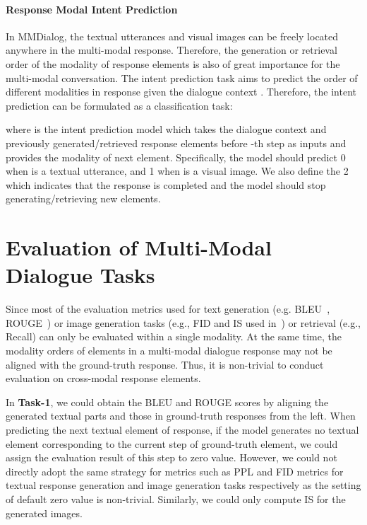 \documentclass[11pt]{article}
\newcommand{\DataName}{MMDialog}
\begin{document}
\paragraph{Response Modal Intent Prediction}
In \DataName, the textual utterances and visual images can be freely located anywhere in the multi-modal response. Therefore, the generation or retrieval order of the modality of response elements is also of great importance for the multi-modal conversation. The intent prediction task aims to predict the order of different modalities in response  given the dialogue context . Therefore, the intent prediction can be formulated as a classification task: 

where  is the intent prediction model which takes the dialogue context  and previously generated/retrieved response elements  before -th step as inputs and provides the modality of next element. Specifically, the model should predict 0 when  is a textual utterance, and 1 when  is a visual image. We also define the 2 which indicates that the response  is completed and the model should stop generating/retrieving new elements.





\section{Evaluation of Multi-Modal Dialogue Tasks}
Since most of the evaluation metrics used for text generation (e.g. BLEU~\cite{papineni-etal-2002-bleu}, ROUGE~\cite{lin-2004-rouge}) or image generation tasks (e.g., FID and IS used in~\citet{ramesh2021zero}) or retrieval (e.g., Recall) can only be evaluated within a single modality. At the same time, the modality orders of elements in a multi-modal dialogue response may not be aligned with the ground-truth response. Thus, it is non-trivial to conduct evaluation on cross-modal response elements. 

In \textbf{Task-1}, we could obtain the BLEU and ROUGE scores by aligning the generated textual parts and those in ground-truth responses from the left. When predicting the next textual element of response, if the model generates no textual element corresponding to the current step of ground-truth element, we could assign the evaluation result of this step to zero value. However, we could not directly adopt the same strategy for metrics such as PPL and FID metrics for textual response generation and image generation tasks respectively as the setting of default zero value is non-trivial. Similarly, we could only compute IS for the generated images. 
\end{document}
